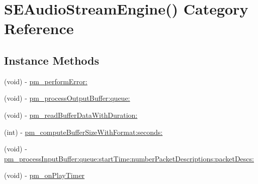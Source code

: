 \hypertarget{category_s_e_audio_stream_engine_07_08}{\section{S\-E\-Audio\-Stream\-Engine() Category Reference}
\label{category_s_e_audio_stream_engine_07_08}
}
\subsection*{Instance Methods}
\begin{DoxyCompactItemize}
\item 
(void) -\/ \hyperlink{category_s_e_audio_stream_engine_07_08_a904166440be2c605407aa2dfd37a8cec}{pm\-\_\-perform\-Error\-:}
\item 
(void) -\/ \hyperlink{category_s_e_audio_stream_engine_07_08_ac7baec71cdb25574abf73b975691d624}{pm\-\_\-process\-Output\-Buffer\-:queue\-:}
\item 
(void) -\/ \hyperlink{category_s_e_audio_stream_engine_07_08_adeb9a1148989f4bea42b99dfc7c24e34}{pm\-\_\-read\-Buffer\-Data\-With\-Duration\-:}
\item 
(int) -\/ \hyperlink{category_s_e_audio_stream_engine_07_08_a3f2ea6f72f3de68056d8b2a159e4b743}{pm\-\_\-compute\-Buffer\-Size\-With\-Format\-:seconds\-:}
\item 
(void) -\/ \hyperlink{category_s_e_audio_stream_engine_07_08_ad31ccee072ba39e61a59856ac4bb2c36}{pm\-\_\-process\-Input\-Buffer\-:queue\-:start\-Time\-:number\-Packet\-Descriptions\-:packet\-Descs\-:}
\item 
(void) -\/ \hyperlink{category_s_e_audio_stream_engine_07_08_a66b8ff5a0c4c3073c26122d247956abd}{pm\-\_\-on\-Play\-Timer}
\end{DoxyCompactItemize}
